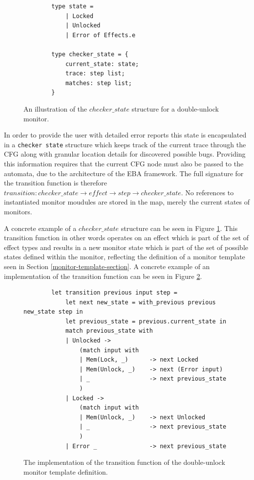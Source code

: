 \begin{figure}[H]
    \centering
    \begin{verbatim}
        type state = 
            | Locked
            | Unlocked
            | Error of Effects.e
	
        type checker_state = {
            current_state: state;
            trace: step list;
            matches: step list;
        }
    \end{verbatim}
    \caption{An illustration of the $checker\_state$ structure for a double-unlock monitor.}
    \label{checker-state}
\end{figure}

\newpar In order to provide the user with detailed error reports this state is encapsulated in a \texttt{checker state} structure which keeps track of the current trace through the CFG along with granular location details for discovered possible bugs. Providing this information requires that the current CFG node must also be passed to the automata, due to the architecture of the EBA framework. The full signature for the transition function is therefore $transition: \mathit{checker\_state} \rightarrow \mathit{effect} \rightarrow \mathit{step} \rightarrow \mathit{checker\_state}$. No references to instantiated monitor moudules are stored in the map, merely the current states of monitors. 

\newpar A concrete example of a $checker\_state$ structure can be seen in Figure \ref{checker-state}. This transition function in other words operates on an effect which is part of the set of effect types and results in a new monitor state which is part of the set of possible states defined within the monitor, reflecting the definition of a monitor template seen in Section \ref{monitor-template-section}. A concrete example of an implementation of the transition function can be seen in Figure \ref{transition-implementation}. 

\begin{figure}[H]
    \centering
    \begin{verbatim}
        let transition previous input step = 
            let next new_state = with_previous previous new_state step in
            let previous_state = previous.current_state in 
            match previous_state with 
            | Unlocked ->
                (match input with 
                | Mem(Lock, _)      -> next Locked
                | Mem(Unlock, _)    -> next (Error input)
                | _                 -> next previous_state
                )
            | Locked ->
                (match input with 
                | Mem(Unlock, _)    -> next Unlocked
                | _                 -> next previous_state
                )
            | Error _               -> next previous_state
    \end{verbatim}
    \caption{The implementation of the transition function of the double-unlock monitor template definition.}
    \label{transition-implementation}
\end{figure}

